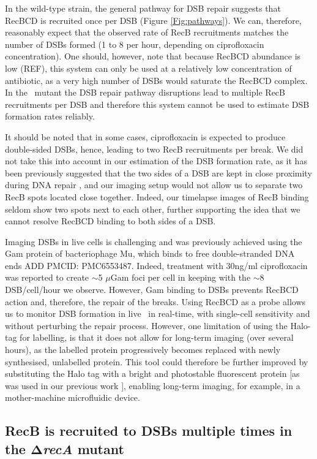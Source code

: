 In the wild-type strain, the general pathway for DSB repair suggests that RecBCD is recruited once per DSB (Figure \ref{Fig:pathways}). We can, therefore, reasonably expect that the observed rate of RecB recruitments matches the number of DSBs formed (1 to 8 per hour, depending on ciprofloxacin concentration). One should, however, note that because RecBCD abundance is low (REF), this system can only be used at a relatively low concentration of antibiotic, as a very high number of DSBs would saturate the RecBCD complex. In the \dreca\ mutant the DSB repair pathway disruptions lead to multiple RecB recruitments per DSB and therefore this system cannot be used to estimate DSB formation rates reliably. 

It should be noted that in some cases, ciprofloxacin is expected to produce double-sided DSBs, hence, leading to two RecB recruitments per break. We did not take this into account in our estimation of the DSB formation rate, as it has been previously suggested that the two sides of a DSB are kept in close proximity during DNA repair \cite{Vickridge2017,Keyamura2019}, and our imaging setup would not allow us to separate two RecB spots located close together. Indeed, our timelapse images of RecB binding seldom show two spots next to each other, further supporting the idea that we cannot resolve RecBCD binding to both sides of a DSB.

Imaging DSBs in live cells is challenging and was previously achieved using the Gam protein of bacteriophage Mu, which binds to free double-stranded DNA ends \cite{Shee2013,Henrikus2020}ADD PMCID: PMC6553487. Indeed, treatment with 30ng/ml ciprofloxacin was reported to create $\sim$5 $\mu$Gam foci per cell in keeping with the $\sim$8 DSB/cell/hour we observe. However, Gam binding to DSBs prevents RecBCD action and, therefore, the repair of the breaks. Using RecBCD as a probe allows us to monitor DSB formation in live \ecoli\ in real-time, with single-cell sensitivity and without perturbing the repair process. However, one limitation of using the Halo-tag for labelling, is that it does not allow for long-term imaging (over several hours), as the labelled protein progressively becomes replaced with newly synthesised, unlabelled protein. This tool could therefore be further improved by substituting the Halo tag with a bright and photostable fluorescent protein [as was used in our previous work \cite{Lepore2019a}], enabling long-term imaging, for example, in a mother-machine microfluidic device.

\subsection*{RecB is recruited to DSBs multiple times in the $\mathbf{\Delta}$\emph{recA} mutant}


